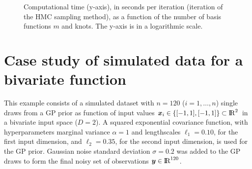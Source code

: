 \documentclass[onecolumn,a4paper,11pt]{article}
\begin{document}
\begin{figure}
\centering
{}
\caption{Computational time (y-axis), in seconds per iteration (iteration of the HMC sampling method), as a function of the number of basis functions $m$ and knots. The y-axis is in a logarithmic scale.}
  \label{ch5_fig14_1_time_gaydata}
\end{figure}


\section{Case study of simulated data for a bivariate function}

This example consists of a simulated dataset with $n=120$ ($i=1,\dots,n$) single draws from a GP prior as function of input values $\bm{x}_i \in \{[-1,1],[-1,1]\} \subset {\rm I\!R}^2$ in a bivariate input space ($D=2$). A squared exponential covariance function, with hyperparameters marginal variance $\alpha=1$ and lengthscales $\ell_1=0.10$, for the first input dimension, and $\ell_2=0.35$, for the second input dimension, is used for the GP prior. Gaussian noise standard deviation $\sigma=0.2$ was added to the GP draws to form the final noisy set of observations $\bm{y} \in {\rm I\!R}^{120}$.
\end{document}
